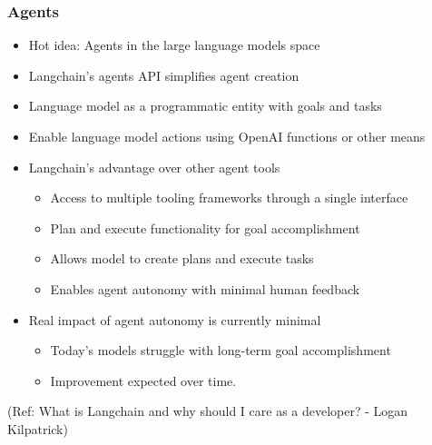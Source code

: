 \begin{frame}[fragile]\frametitle{Agents}

\begin{itemize}
\item Hot idea: Agents in the large language models space
\item Langchain's agents API simplifies agent creation
\item Language model as a programmatic entity with goals and tasks
\item Enable language model actions using OpenAI functions or other means
\item Langchain's advantage over other agent tools
	\begin{itemize}
	\item Access to multiple tooling frameworks through a single interface
	\item Plan and execute functionality for goal accomplishment
	\item Allows model to create plans and execute tasks
	\item Enables agent autonomy with minimal human feedback
	\end{itemize}
\item Real impact of agent autonomy is currently minimal
	\begin{itemize}
	\item Today's models struggle with long-term goal accomplishment
	\item Improvement expected over time.
	\end{itemize}
\end{itemize}

{\tiny (Ref: What is Langchain and why should I care as a developer? - Logan Kilpatrick)}

\end{frame}

